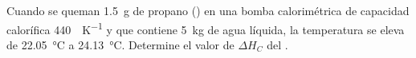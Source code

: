 Cuando se queman \SI{1,5}{\gram} de propano () en una bomba calorimétrica de capacidad calorífica \SI{440}{\calorie\per\kelvin} y que contiene \SI{5}{\kilogram} de agua líquida, la temperatura se eleva de \SI{22,05}{\celsius} a \SI{24,13}{\celsius}. Determine el valor de $\Delta H_C$ del .
